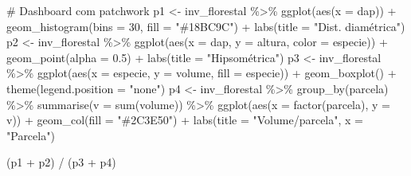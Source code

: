 \documentclass[
  letterpaper,
]{scrbook}
\newenvironment{Shaded}{\begin{snugshade}}{\end{snugshade}}
\newcommand{\AttributeTok}[1]{\textcolor[rgb]{0.40,0.45,0.13}{#1}}
\newcommand{\CommentTok}[1]{\textcolor[rgb]{0.37,0.37,0.37}{#1}}
\newcommand{\DecValTok}[1]{\textcolor[rgb]{0.68,0.00,0.00}{#1}}
\newcommand{\FloatTok}[1]{\textcolor[rgb]{0.68,0.00,0.00}{#1}}
\newcommand{\FunctionTok}[1]{\textcolor[rgb]{0.28,0.35,0.67}{#1}}
\newcommand{\NormalTok}[1]{\textcolor[rgb]{0.00,0.23,0.31}{#1}}
\newcommand{\OtherTok}[1]{\textcolor[rgb]{0.00,0.23,0.31}{#1}}
\newcommand{\SpecialCharTok}[1]{\textcolor[rgb]{0.37,0.37,0.37}{#1}}
\newcommand{\StringTok}[1]{\textcolor[rgb]{0.13,0.47,0.30}{#1}}
\newcounter{none} %
\begin{document}
\begin{Shaded}
\begin{Highlighting}[]
\CommentTok{\# Dashboard com patchwork}
\NormalTok{p1 }\OtherTok{\textless{}{-}}\NormalTok{ inv\_florestal }\SpecialCharTok{\%\textgreater{}\%} \FunctionTok{ggplot}\NormalTok{(}\FunctionTok{aes}\NormalTok{(}\AttributeTok{x =}\NormalTok{ dap)) }\SpecialCharTok{+} \FunctionTok{geom\_histogram}\NormalTok{(}\AttributeTok{bins =} \DecValTok{30}\NormalTok{, }\AttributeTok{fill =} \StringTok{"\#18BC9C"}\NormalTok{) }\SpecialCharTok{+} \FunctionTok{labs}\NormalTok{(}\AttributeTok{title =} \StringTok{"Dist. diamétrica"}\NormalTok{)}
\NormalTok{p2 }\OtherTok{\textless{}{-}}\NormalTok{ inv\_florestal }\SpecialCharTok{\%\textgreater{}\%} \FunctionTok{ggplot}\NormalTok{(}\FunctionTok{aes}\NormalTok{(}\AttributeTok{x =}\NormalTok{ dap, }\AttributeTok{y =}\NormalTok{ altura, }\AttributeTok{color =}\NormalTok{ especie)) }\SpecialCharTok{+} \FunctionTok{geom\_point}\NormalTok{(}\AttributeTok{alpha =} \FloatTok{0.5}\NormalTok{) }\SpecialCharTok{+} \FunctionTok{labs}\NormalTok{(}\AttributeTok{title =} \StringTok{"Hipsométrica"}\NormalTok{)}
\NormalTok{p3 }\OtherTok{\textless{}{-}}\NormalTok{ inv\_florestal }\SpecialCharTok{\%\textgreater{}\%} \FunctionTok{ggplot}\NormalTok{(}\FunctionTok{aes}\NormalTok{(}\AttributeTok{x =}\NormalTok{ especie, }\AttributeTok{y =}\NormalTok{ volume, }\AttributeTok{fill =}\NormalTok{ especie)) }\SpecialCharTok{+} \FunctionTok{geom\_boxplot}\NormalTok{() }\SpecialCharTok{+} \FunctionTok{theme}\NormalTok{(}\AttributeTok{legend.position =} \StringTok{"none"}\NormalTok{)}
\NormalTok{p4 }\OtherTok{\textless{}{-}}\NormalTok{ inv\_florestal }\SpecialCharTok{\%\textgreater{}\%} \FunctionTok{group\_by}\NormalTok{(parcela) }\SpecialCharTok{\%\textgreater{}\%} \FunctionTok{summarise}\NormalTok{(}\AttributeTok{v =} \FunctionTok{sum}\NormalTok{(volume)) }\SpecialCharTok{\%\textgreater{}\%}
  \FunctionTok{ggplot}\NormalTok{(}\FunctionTok{aes}\NormalTok{(}\AttributeTok{x =} \FunctionTok{factor}\NormalTok{(parcela), }\AttributeTok{y =}\NormalTok{ v)) }\SpecialCharTok{+} \FunctionTok{geom\_col}\NormalTok{(}\AttributeTok{fill =} \StringTok{"\#2C3E50"}\NormalTok{) }\SpecialCharTok{+} \FunctionTok{labs}\NormalTok{(}\AttributeTok{title =} \StringTok{"Volume/parcela"}\NormalTok{, }\AttributeTok{x =} \StringTok{"Parcela"}\NormalTok{)}

\NormalTok{(p1 }\SpecialCharTok{+}\NormalTok{ p2) }\SpecialCharTok{/}\NormalTok{ (p3 }\SpecialCharTok{+}\NormalTok{ p4)}
\end{Highlighting}
\end{Shaded}
\end{document}
